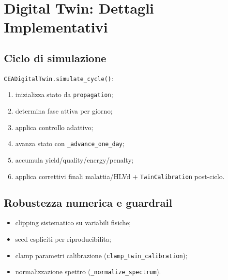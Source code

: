 ﻿\documentclass[11pt,a4paper]{report}
\begin{document}
\newpage
\chapter{Digital Twin: Dettagli Implementativi}

\section{Ciclo di simulazione}
\texttt{CEADigitalTwin.simulate\_cycle()}:
\begin{enumerate}
  \item inizializza stato da \texttt{propagation};
  \item determina fase attiva per giorno;
  \item applica controllo adattivo;
  \item avanza stato con \texttt{\_advance\_one\_day};
  \item accumula yield/quality/energy/penalty;
  \item applica correttivi finali malattia/HLVd + \texttt{TwinCalibration} post-ciclo.
\end{enumerate}

\section{Robustezza numerica e guardrail}
\begin{itemize}
  \item clipping sistematico su variabili fisiche;
  \item seed espliciti per riproducibilita;
  \item clamp parametri calibrazione (\texttt{clamp\_twin\_calibration});
  \item normalizzazione spettro (\texttt{\_normalize\_spectrum}).
\end{itemize}
\end{document}
